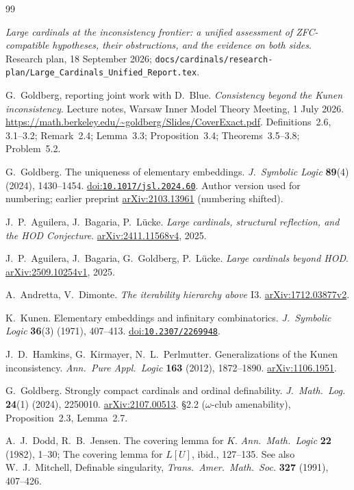 \documentclass[11pt,letterpaper]{article}
\theoremstyle{definition}
\numberwithin{equation}{section}
\newcommand{\arxiv}[1]{\href{https://arxiv.org/abs/#1}{arXiv:#1}}
\newcommand{\doi}[1]{\href{https://doi.org/#1}{doi:\nolinkurl{#1}}}
\begin{document}
{}
\begin{thebibliography}{99}
\small
\setlength{\itemsep}{6pt}

\emph{Large cardinals at the inconsistency frontier: a unified assessment of ZFC-compatible hypotheses, their obstructions, and the evidence on both sides}. Research plan, 18 September 2026; \nolinkurl{docs/cardinals/research-plan/Large_Cardinals_Unified_Report.tex}.

G.~Goldberg, reporting joint work with D.~Blue. \emph{Consistency beyond the Kunen inconsistency}. Lecture notes, Warsaw Inner Model Theory Meeting, 1 July 2026. \url{https://math.berkeley.edu/~goldberg/Slides/CoverExact.pdf}. Definitions~2.6, 3.1--3.2; Remark~2.4; Lemma~3.3; Proposition~3.4; Theorems~3.5--3.8; Problem~5.2.

G.~Goldberg. The uniqueness of elementary embeddings. \emph{J.\ Symbolic Logic} \textbf{89}(4) (2024), 1430--1454. \doi{10.1017/jsl.2024.60}. Author version used for numbering; earlier preprint \arxiv{2103.13961} (numbering shifted).

J.~P.~Aguilera, J.~Bagaria, P.~L\"ucke. \emph{Large cardinals, structural reflection, and the HOD Conjecture}. \arxiv{2411.11568v4}, 2025.

J.~P.~Aguilera, J.~Bagaria, G.~Goldberg, P.~L\"ucke. \emph{Large cardinals beyond HOD}. \arxiv{2509.10254v1}, 2025.

A.~Andretta, V.~Dimonte. \emph{The iterability hierarchy above $\mathrm{I3}$}. \arxiv{1712.03877v2}.

K.~Kunen. Elementary embeddings and infinitary combinatorics. \emph{J.\ Symbolic Logic} \textbf{36}(3) (1971), 407--413. \doi{10.2307/2269948}.

J.~D.~Hamkins, G.~Kirmayer, N.~L.~Perlmutter. Generalizations of the Kunen inconsistency. \emph{Ann.\ Pure Appl.\ Logic} \textbf{163} (2012), 1872--1890. \arxiv{1106.1951}.

G.~Goldberg. Strongly compact cardinals and ordinal definability. \emph{J.\ Math.\ Log.} \textbf{24}(1) (2024), 2250010. \arxiv{2107.00513}. \S2.2 ($\omega$-club amenability), Proposition~2.3, Lemma~2.7.

A.~J.~Dodd, R.~B.~Jensen. The covering lemma for $K$. \emph{Ann.\ Math.\ Logic} \textbf{22} (1982), 1--30; The covering lemma for $L[U]$, ibid., 127--135. See also W.~J.~Mitchell, Definable singularity, \emph{Trans.\ Amer.\ Math.\ Soc.} \textbf{327} (1991), 407--426.


\end{thebibliography}
\end{document}

